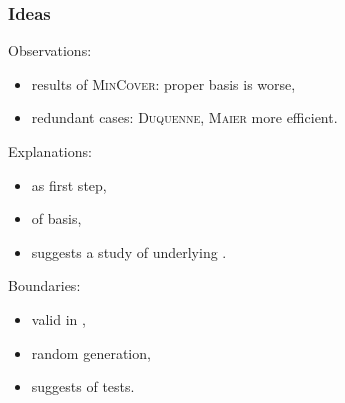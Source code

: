 \begin{frame}
\frametitle{Ideas}

Observations:
\begin{itemize}
	\item results of \textsc{MinCover}: proper basis is worse,
	\item redundant cases: \textsc{Duquenne}, \textsc{Maier} more efficient.
\end{itemize}

\vspace{0.5em}

Explanations:
\begin{itemize}
	\item {} as first step,
	\item {} of basis,
	\item suggests a study of underlying .
\end{itemize}

\vspace{0.5em}

Boundaries:
\begin{itemize}
	\item valid in ,
	\item random generation,
	\item suggests  of tests.
\end{itemize}

\end{frame}